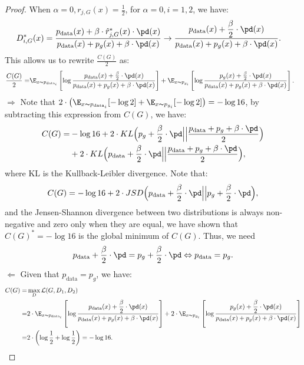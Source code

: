 \begin{proof}
When $\alpha=0, r_{j,G}(x)=\frac{1}{2}$, for $\alpha= 0, i=1,2$, we have:
\begin{align}
    D_{i,G}^*(x)&=\dfrac{p_{\text{data}}(x)+\beta \cdot \hat{r}_{j,G}^*(x)\cdot \pd(x)}{p_{\text{data}}(x)+p_{g}(x)+\beta\cdot \pd(x)}\rightarrow \dfrac{p_{\text{data}}(x)+\dfrac{\beta}{2} \cdot \pd(x)}{p_{\text{data}}(x)+p_{g}(x)+\beta\cdot \pd(x)}.
\end{align}
This allows us to rewrite $\frac{C(G)}{2}$ as:
\begin{align}
    \frac{C(G)}{2}=&\E_{x\thicksim p_{\text{data}_i}}\left[\log \frac{p_{\text{data}}(x)+\frac{\beta}{2}\cdot \pd(x)}{p_{\text{data}}(x)+p_{g}(x)+\beta\cdot \pd(x)}\right]+\E_{x\thicksim p_{g_i
     }}\left[\log \frac{p_{g}(x)+\frac{\beta}{2}\cdot \pd(x)}{p_{\text{data}}(x)+p_{g}(x)+\beta\cdot \pd(x)}\right].
\end{align}
$\Longrightarrow$
Note that $2\cdot \big(\E_{x\thicksim p_{\text{data}_i}}[-\log2]+\E_{x\thicksim p_{g_i}}[-\log2]\big)=-\log{16}$, by subtracting this expression from $C(G)$, we have:
\begin{align}
    C(G)=&-\log{16}+ 2\cdot KL\Big(p_{g}+ \dfrac{\beta}{2}\cdot \pd\Big|\Big|\dfrac{p_{\text{data}}+p_{g}+\beta\cdot \pd}{2}\Big)\notag\\
    &+2\cdot KL\Big(p_{\text{data}}+\dfrac{\beta}{2}\cdot \pd\Big|\Big|\dfrac{p_{\text{data}}+p_{g}+\beta\cdot \pd}{2}\Big),
\end{align}
where KL is the Kullback-Leibler divergence. Note that:
\begin{align}
    C(G)=-\log{16}+2\cdot  JSD\Big(p_{\text{data}}+\dfrac{\beta}{2}\cdot \pd\Big|\Big|p_{g}+\dfrac{\beta}{2}\cdot \pd\Big),
\end{align}
and the Jensen-Shannon divergence between two distributions is always non-negative and zero only when they are equal, we have shown that $C(G)^*=-\log{16}$ is the global minimum of $C(G)$. Thus, we need $$p_{\text{data}}+\dfrac{\beta}{2}\cdot \pd=p_{g}+\dfrac{\beta}{2}\cdot \pd\Leftrightarrow p_{\text{data}}=p_g.$$
$\Longleftarrow$
Given that $p_{\text{data}}=p_{g}$, we have:
\begin{align}
    C(G)=&\max_{D}\mathcal{L}(G, D_1, D_2)\notag\\
     =&2\cdot \E_{x\thicksim p_{\text{data}_i}}\left[\log \dfrac{p_{\text{data}}(x)+\dfrac{\beta}{2}\cdot \pd(x)}{p_{\text{data}}(x)+p_{g}(x)+\beta\cdot \pd(x)}\right]+2\cdot \E_{x\thicksim p_{g_i}}\left[\log \dfrac{p_{g}(x)+\dfrac{\beta}{2}\cdot \pd(x)}{p_{\text{data}}(x)+p_{g}(x)+\beta\cdot \pd(x)}\right]\notag\\
     =& 2\cdot \left(\log\dfrac{1}{2}+\log\dfrac{1}{2}\right)=-\log{16}.
\end{align}


\end{proof}

